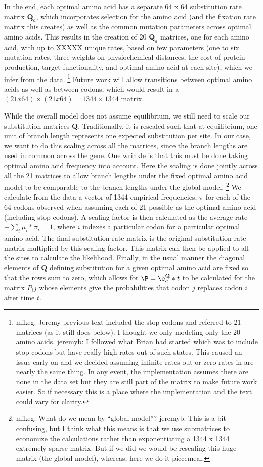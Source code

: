 \documentclass{article}
\newcommand{\Qmatrixa}{\ensuremath{\Qmatrix_a}\xspace}
\newcommand{\Qmatrix}{\mathbf{Q}\xspace}
\begin{document}
In the end, each optimal amino acid has a separate 64 x 64 substitution rate matrix \Qmatrixa, which incorporates selection for the amino acid (and the fixation rate matrix this creates) as well as the common mutation parameters across optimal amino acids. 
This results in the creation of 20  \Qmatrixa  matrices, one for each amino acid, with up to XXXXX unique rates, based on few parameters (one to six mutation rates, three weights on physiochemical distances, the cost of protein production, target functionality, and optimal amino acid at each site), which we infer from the data.
\footnote{mikeg: Jeremy previous text included the stop codons and referred to 21 matrices (as it still does below). 
I thought we only modeling only the 20 amino acids.
jeremyb: I followed what Brian had started which was to include stop codons but have really high rates out of such states. 
This caused an issue early on and we decided assuming infinite rates out or zero rates in are nearly the same thing.
In any event, the implementation assumes there are none in the data set but they are still part of the matrix to make future work easier.
So if necessary this is a place where the implementation and the text could vary for clarity.
}
Future work will allow transitions between optimal amino acids as well as between codons, which would result in a $(21 x 64) \times (21 x 64) =  1344 \times 1344$ matrix. 


While the overall model does not assume equilibrium, we still need to scale our substitution matrices $\Qmatrix$.
Traditionally, it is rescaled such that at equilibrium, one unit of branch length represents one expected substitution per site.
In our case, we want to do this scaling across all the matrices, since the branch lengths are used in common across the gene.
One wrinkle is that this must be done taking optimal amino acid frequency into account. 
Here the scaling is done jointly across all the 21 matrices to allow branch lengths under the fixed optimal amino acid model to be comparable to the branch lengths under the global model.
\footnote{mikeg: What do we mean by ``global model''?
jeremyb: This is a bit confusing, but I think what this means is that we use submatrices to economize the calculations rather than exponentiating a 1344 x 1344 extremely sparse matrix.
But if we did we would be rescaling this huge matrix (the global model), whereas, here we do it piecemeal.
}
We calculate from the data a vector of 1344 empirical frequencies, $\pi$ for each of the 64 codons observed when assuming each of 21 possible as the optimal amino acid (including stop codons).
A scaling factor is then calculated as the average rate $-\sum_i{} \mu_i*\pi_i=1$, where $i$ indexes a particular codon for a particular optimal amino acid.
The final substitution-rate matrix is the original substitution-rate matrix multiplied by this scaling factor.
This matrix can then be applied to all the sites to calculate the likelihood. 
Finally, in the usual manner the diagonal elements of $\Qmatrix$ defining substitution for a given optimal amino acid are fixed so that the rows sum to zero, which allows for $\P = \e^\Qmatrixa*t$ to be calculated for the matrix $P_ij$ whose elements give the probabilities that codon $j$ replaces codon $i$ after time $t$. 
\end{document}
